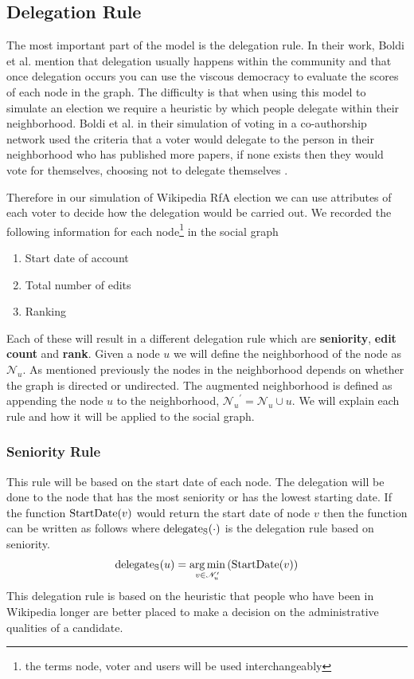 \subsection{Delegation Rule}
The most important part of the model is the delegation rule. In their work, Boldi et al. mention that delegation usually happens within the community and that once delegation occurs you can use the viscous democracy to evaluate the scores of each node in the graph. The difficulty is that when using this model to simulate an election we require a heuristic by which people delegate within their neighborhood. Boldi et al. in their simulation of voting in a co-authorship network used the criteria that a voter would delegate to the person in their neighborhood who has published more papers, if none exists then they would vote for themselves, choosing not to delegate themselves \cite{ViscousDemocracy}.
\smallskip

Therefore in our simulation of Wikipedia RfA election we can use attributes of each voter to decide how the delegation would be carried out. We recorded the following information for each node\footnote{the terms node, voter and users will be used interchangeably} in the social graph
\begin{enumerate}
    \item Start date of account
    \item Total number of edits
    \item Ranking
\end{enumerate}
Each of these will result in a different delegation rule which are \textbf{seniority}, \textbf{edit count} and \textbf{rank}. Given a node $u$ we will define the neighborhood of the node as $\mathcal{N}_u$. As mentioned previously the nodes in the neighborhood depends on whether the graph is directed or undirected. The augmented neighborhood is defined as appending the node $u$ to the neighborhood, ${\mathcal{N}_u}^\prime = \mathcal{N}_u \cup u$. We will explain each rule and how it will be applied to the social graph.

\subsubsection{Seniority Rule}
This rule will be based on the start date of each node. The delegation will be done to the node that has the most seniority or has the lowest starting date. If the function $\operatorname*{StartDate}(v)$ would return the start date of node $v$ then the function can be written as follows where $\operatorname*{delegate_S}(\cdot)$ is the delegation rule based on seniority.
\[\operatorname*{delegate_S}(u)  = \operatorname*{arg\,min}_{v \in \mathcal{N}_u^\prime} \left( \operatorname*{StartDate}(v) \right)\]
This delegation rule is based on the heuristic that people who have been in Wikipedia longer are better placed to make a decision on the administrative qualities of a candidate. 

